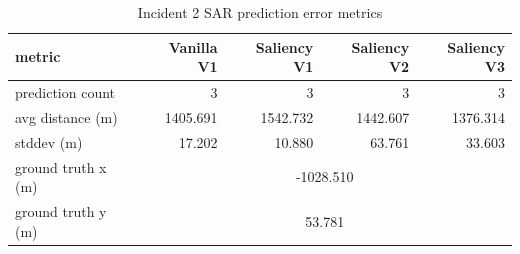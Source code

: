 \begin{table}[ht]
\centering
\caption{Incident 2 SAR prediction error metrics}
\label{tab:sar-incident-2}
\begin{tabular}{lrrrr}
\hline
metric & Vanilla V1 & Saliency V1 & Saliency V2 & Saliency V3 \\
\hline
prediction count & 3 & 3 & 3 & 3 \\
avg distance (m) & 1405.691 & 1542.732 & 1442.607 & 1376.314 \\
stddev (m) & 17.202 & 10.880 & 63.761 & 33.603 \\
ground truth x (m) & \multicolumn{4}{c}{-1028.510} \\
ground truth y (m) & \multicolumn{4}{c}{53.781} \\
\hline
\end{tabular}
\end{table}
